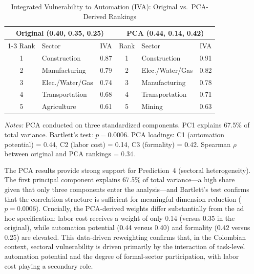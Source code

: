 \documentclass[5p,times,authoryear]{elsarticle}
\begin{document}
\begin{table}[htbp]
\centering
\begin{threeparttable}
\caption{Integrated Vulnerability to Automation (IVA): Original vs.\ PCA-Derived Rankings}
\label{tab:iva_rankings}
\small
\setlength{\tabcolsep}{5pt}
\begin{tabular}{@{}clcclc@{}}
\toprule
\multicolumn{3}{c}{Original (0.40, 0.35, 0.25)} & \multicolumn{3}{c}{PCA (0.44, 0.14, 0.42)} \\
\cmidrule{1-3} \cmidrule{4-6}
Rank & Sector & IVA & Rank & Sector & IVA \\
\midrule
1 & Construction & 0.87 & 1 & Construction & 0.91 \\
2 & Manufacturing & 0.79 & 2 & Elec./Water/Gas & 0.82 \\
3 & Elec./Water/Gas & 0.74 & 3 & Manufacturing & 0.78 \\
4 & Transportation & 0.68 & 4 & Transportation & 0.71 \\
5 & Agriculture & 0.61 & 5 & Mining & 0.63 \\
\bottomrule
\end{tabular}
\begin{tablenotes}
\footnotesize
\item \textit{Notes:} PCA conducted on three standardized components. PC1 explains 67.5\% of total variance. Bartlett's test: $p = 0.0006$. PCA loadings: C1 (automation potential) = 0.44, C2 (labor cost) = 0.14, C3 (formality) = 0.42. Spearman $\rho$ between original and PCA rankings = 0.34.
\end{tablenotes}
\end{threeparttable}
\end{table}

The PCA results provide strong support for Prediction~4 (sectoral heterogeneity). The first principal component explains 67.5\% of total variance---a high share given that only three components enter the analysis---and Bartlett's test confirms that the correlation structure is sufficient for meaningful dimension reduction ($p = 0.0006$). Crucially, the PCA-derived weights differ substantially from the ad hoc specification: labor cost receives a weight of only 0.14 (versus 0.35 in the original), while automation potential (0.44 versus 0.40) and formality (0.42 versus 0.25) are elevated. This data-driven reweighting confirms that, in the Colombian context, sectoral vulnerability is driven primarily by the interaction of task-level automation potential and the degree of formal-sector participation, with labor cost playing a secondary role.
\end{document}
